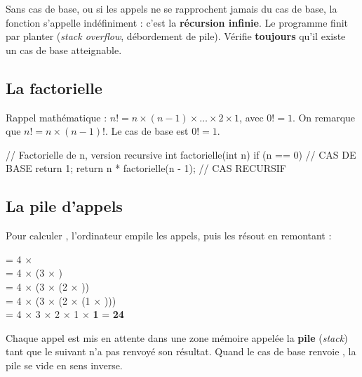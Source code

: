 \begin{attention}
Sans cas de base, ou si les appels ne se rapprochent jamais du cas de base, la
fonction s'appelle indéfiniment : c'est la \textbf{récursion infinie}. Le
programme finit par planter (\emph{stack overflow}, débordement de pile). Vérifie
\textbf{toujours} qu'il existe un cas de base atteignable.
\end{attention}

\subsection{La factorielle}

Rappel mathématique : $n! = n \times (n-1) \times \dots \times 2 \times 1$, avec
$0! = 1$. On remarque que $n! = n \times (n-1)!$. Le cas de base est $0! = 1$.

\begin{codec}
// Factorielle de n, version recursive
int factorielle(int n) {
    if (n == 0) {            // CAS DE BASE
        return 1;
    }
    return n * factorielle(n - 1);   // CAS RECURSIF
}
\end{codec}

\subsection{La pile d'appels}

Pour calculer , l'ordinateur empile les appels, puis les
résout en remontant :

\begin{exemple}
 = 4 $\times$ \\
\hspace*{2em}= 4 $\times$ (3 $\times$ )\\
\hspace*{2em}= 4 $\times$ (3 $\times$ (2 $\times$ ))\\
\hspace*{2em}= 4 $\times$ (3 $\times$ (2 $\times$ (1 $\times$ )))\\
\hspace*{2em}= 4 $\times$ 3 $\times$ 2 $\times$ 1 $\times$ \textbf{1} = \textbf{24}
\end{exemple}

Chaque appel est mis en attente dans une zone mémoire appelée la \textbf{pile}
(\emph{stack}) tant que le suivant n'a pas renvoyé son résultat. Quand le cas de
base  renvoie , la pile se vide en sens inverse.

